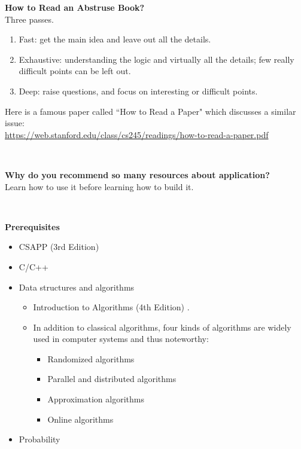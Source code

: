 \documentclass{article}
\begin{document}
\noindent
\textbf{How to Read an Abstruse Book?}\\
Three passes.
\begin{enumerate}
    \item Fast: get the main idea and leave out all the details.
    \item Exhaustive: understanding the logic and virtually all the details; few really difficult points can be left out.
    \item Deep: raise questions, and focus on interesting or difficult points.
\end{enumerate}
Here is a famous paper called ``How to Read a Paper" which discusses a similar issue:\\
\href{https://web.stanford.edu/class/cs245/readings/how-to-read-a-paper.pdf}{https://web.stanford.edu/class/cs245/readings/how-to-read-a-paper.pdf}

~

\noindent
\textbf{Why do you recommend so many resources about application?}\\
Learn how to use it before learning how to build it.

~

\noindent
\textbf{Prerequisites}
\begin{itemize}
    \item CSAPP (3rd Edition) \cite{bryant2015computer}
    \item C/C++
    \item Data structures and algorithms
    \begin{itemize}
        \item Introduction to Algorithms (4th Edition) \cite{cormen2009introduction}.
        \item In addition to classical algorithms, four kinds of algorithms are widely used in computer systems and thus noteworthy:
        \begin{itemize}
            \item Randomized algorithms
            \item Parallel and distributed algorithms
            \item Approximation algorithms
            \item Online algorithms
        \end{itemize}
    \end{itemize}
    \item Probability
\end{itemize}
\end{document}
